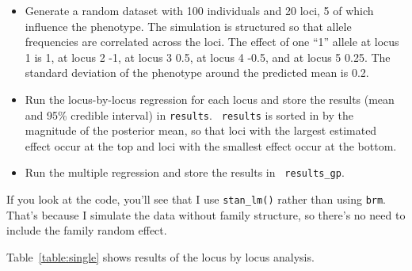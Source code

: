\documentclass[12pt]{article}
\begin{document}
\begin{itemize}

\item Generate a random dataset with 100 individuals and 20 loci, 5 of
  which influence the phenotype. The simulation is structured so that
  allele frequencies are correlated across the loci. The effect of one
  ``1'' allele at locus 1 is 1, at locus 2 -1, at locus 3 0.5, at
  locus 4 -0.5, and at locus 5 0.25. The standard deviation of the
  phenotype around the predicted mean is 0.2.

\item Run the locus-by-locus regression for each locus and store the
  results (mean and 95\% credible interval) in {\tt results}. {\tt
    results} is sorted in by the magnitude of the posterior mean, so
  that loci with the largest estimated effect occur at the top and
  loci with the smallest effect occur at the bottom.

\item Run the multiple regression and store the results in {\tt
    results\_gp}.  
    
\end{itemize}

If you look at the code, you'll see that I use {\tt stan\_lm()} rather
than using {\tt brm}. That's because I simulate the data without
family structure, so there's no need to include the family random
effect.

Table~\ref{table:single} shows results of the locus by locus analysis.
\end{document}
